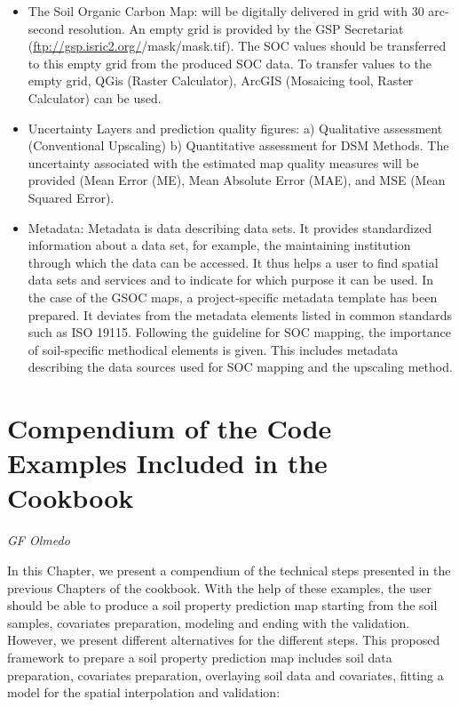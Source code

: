 \documentclass[10pt,b5paper,]{book}
\providecommand{\tightlist}{%
  \setlength{\itemsep}{0pt}\setlength{\parskip}{0pt}}
\theoremstyle{definition}
\theoremstyle{definition}
\theoremstyle{definition}
\theoremstyle{remark}
\begin{document}
\begin{itemize}
\tightlist
\item
  The Soil Organic Carbon Map: will be digitally delivered in grid with
  30 arc-second resolution. An empty grid is provided by the GSP
  Secretariat (\url{ftp://gsp.isric2.org/}/mask/mask.tif). The SOC
  values should be transferred to this empty grid from the produced SOC
  data. To transfer values to the empty grid, QGis (Raster Calculator),
  ArcGIS (Mosaicing tool, Raster Calculator) can be used.
\item
  Uncertainty Layers and prediction quality figures: a) Qualitative
  assessment (Conventional Upscaling) b) Quantitative assessment for DSM
  Methods. The uncertainty associated with the estimated map quality
  measures will be provided (Mean Error (ME), Mean Absolute Error (MAE),
  and MSE (Mean Squared Error).
\item
  Metadata: Metadata is data describing data sets. It provides
  standardized information about a data set, for example, the
  maintaining institution through which the data can be accessed. It
  thus helps a user to find spatial data sets and services and to
  indicate for which purpose it can be used. In the case of the GSOC
  maps, a project-specific metadata template has been prepared. It
  deviates from the metadata elements listed in common standards such as
  ISO 19115. Following the guideline for SOC mapping, the importance of
  soil-specific methodical elements is given. This includes metadata
  describing the data sources used for SOC mapping and the upscaling
  method.
\end{itemize}

\hypertarget{compendium-of-the-code-examples-included-in-the-cookbook}{%
\chapter{Compendium of the Code Examples Included in the
Cookbook}\label{compendium-of-the-code-examples-included-in-the-cookbook}}

\emph{GF Olmedo}

In this Chapter, we present a compendium of the technical steps
presented in the previous Chapters of the cookbook. With the help of
these examples, the user should be able to produce a soil property
prediction map starting from the soil samples, covariates preparation,
modeling and ending with the validation. However, we present different
alternatives for the different steps. This proposed framework to prepare
a soil property prediction map includes soil data preparation,
covariates preparation, overlaying soil data and covariates, fitting a
model for the spatial interpolation and validation:
\end{document}
